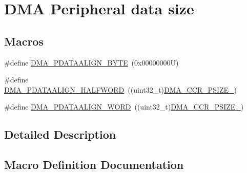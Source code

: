 \hypertarget{group___d_m_a___peripheral__data__size}{}\section{D\+MA Peripheral data size}
\label{group___d_m_a___peripheral__data__size}
\subsection*{Macros}
\begin{DoxyCompactItemize}
\item 
\#define \hyperlink{group___d_m_a___peripheral__data__size_ga55b8c8f5ec95f10d26d6c5b1c9136730}{D\+M\+A\+\_\+\+P\+D\+A\+T\+A\+A\+L\+I\+G\+N\+\_\+\+B\+Y\+TE}~(0x00000000\+U)
\item 
\#define \hyperlink{group___d_m_a___peripheral__data__size_gac08bfd907442dba5358830b247135bcc}{D\+M\+A\+\_\+\+P\+D\+A\+T\+A\+A\+L\+I\+G\+N\+\_\+\+H\+A\+L\+F\+W\+O\+RD}~((uint32\+\_\+t)\hyperlink{group___peripheral___registers___bits___definition_ga4b3726c7d0fd3b00e33637f163c79128}{D\+M\+A\+\_\+\+C\+C\+R\+\_\+\+P\+S\+I\+Z\+E\+\_})
\item 
\#define \hyperlink{group___d_m_a___peripheral__data__size_gaad50e97cbc4a726660db9c3f42ac93b0}{D\+M\+A\+\_\+\+P\+D\+A\+T\+A\+A\+L\+I\+G\+N\+\_\+\+W\+O\+RD}~((uint32\+\_\+t)\hyperlink{group___peripheral___registers___bits___definition_ga8e8d8786f16dda2bef035ba2df15b69d}{D\+M\+A\+\_\+\+C\+C\+R\+\_\+\+P\+S\+I\+Z\+E\+\_})
\end{DoxyCompactItemize}


\subsection{Detailed Description}


\subsection{Macro Definition Documentation}
\mbox{\label{group___d_m_a___peripheral__data__size_ga55b8c8f5ec95f10d26d6c5b1c9136730}} 
